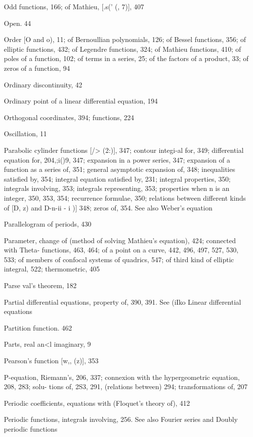 Odd functions, 166; of Mathieu, [.s(' (, 7)], 407

Open. 44

Order [O and o), 11; of Bernoullian polynomials, 126; of Bessel functions, 356; of elliptic
functions, 432; of Legendre functions, 324; of Mathieu functions, 410; of poles of a
function, 102; of terms in a series, 25; of the factors of a product, 33; of zeros of a
function, 94

Ordinary discontinuity, 42

Ordinary point of a linear differential equation, 194

Orthogonal coordinates, 394; functions, 224

Oscillation, 11

Parabolic cylinder functions [/>  (2:)], 347; contour integi-al for, 349; differential equation for,
204,;i()9, 347; expansion in a power series, 347; expansion of a function as a series of, 351;
general asymptotic expansion of, 348; inequalities satisfied by, 354; integral equation
satisfied by, 231; integral properties, 350; integrals involving, 353; integrals representing,
353; properties when n is an integer, 350, 353, 354; recurrence formulae, 350; relations
between different kinds of [D,  z) and D-n-ii - i )]  348; zeros of, 354. See also Weber's
equation

Parallelogram of periods, 430

Parameter, change of (method of solving Mathieu's equation), 424; connected with Theta-
functions, 463, 464; of a point on a curve, 442, 496, 497, 527, 530, 533; of members of
confocal systems of quadrics, 547; of third kind of elliptic integral, 522; thermometric, 405

Parse val's theorem, 182

Partial differential equations, property of, 390, 391. See (iIko Linear differential equations

Partition function. 462

Parts, real an<l imaginary, 9

Pearson's function [w,, (z)], 353

P-equation, Riemann's, 206, 337; connexion with the hypergeometric equation, 208, 283; solu-
tions of, 2S3, 291, (relations between) 294; transformations of, 207

Periodic coefficients, equations with (Floquet's theory of), 412

Periodic functions, integrals involving, 256. See also Fourier series and Doubly periodic
functions

